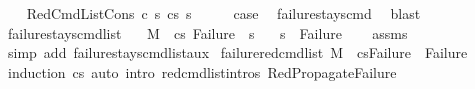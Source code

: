 \begin{isabellebody}
\isamarkupfalse%
\isanewline
\ \ \isamarkupfalse%
\ {\isacharparenleft}{\kern0pt}RedCmdListCons\ c\ s{\isacharprime}{\kern0pt}\ cs\ s{\isacharprime}{\kern0pt}{\isacharprime}{\kern0pt}{\isacharparenright}{\kern0pt}\isanewline
\ \ \isamarkupfalse%
\ \isamarkupfalse%
\ {\isacharquery}{\kern0pt}case\ \isamarkupfalse%
\ failure{\isacharunderscore}{\kern0pt}stays{\isacharunderscore}{\kern0pt}cmd\ \isamarkupfalse%
\ blast\isanewline
{}\isamarkupfalse%
%
\endisatagproof
{\isafoldproof}%
%
\isadelimproof
\isanewline
%
\endisadelimproof
\isanewline
{}\isamarkupfalse%
\ failure{\isacharunderscore}{\kern0pt}stays{\isacharunderscore}{\kern0pt}cmd{\isacharunderscore}{\kern0pt}list{\isacharcolon}{\kern0pt}\isanewline
\ \ \ {\isachardoublequoteopen}M{\isacharcomma}{\kern0pt}{\isasymLambda}{\isacharcomma}{\kern0pt}{\isasymGamma}{\isacharcomma}{\kern0pt}{\isasymOmega}\ {\isasymturnstile}\ {\isasymlangle}cs{\isacharcomma}{\kern0pt}\ Failure{\isasymrangle}\ {\isacharbrackleft}{\kern0pt}{\isasymrightarrow}{\isacharbrackright}{\kern0pt}\ s{\isacharprime}{\kern0pt}{\isachardoublequoteclose}\isanewline
\ \ \ {\isachardoublequoteopen}s{\isacharprime}{\kern0pt}\ {\isacharequal}{\kern0pt}\ Failure{\isachardoublequoteclose}\isanewline
%
\isadelimproof
\ \ %
\endisadelimproof
%
\isatagproof
{}\isamarkupfalse%
\ assms\isanewline
\ \ \isamarkupfalse%
\ {\isacharparenleft}{\kern0pt}simp\ add{\isacharcolon}{\kern0pt}\ failure{\isacharunderscore}{\kern0pt}stays{\isacharunderscore}{\kern0pt}cmd{\isacharunderscore}{\kern0pt}list{\isacharunderscore}{\kern0pt}aux{\isacharparenright}{\kern0pt}%
\endisatagproof
{\isafoldproof}%
%
\isadelimproof
\isanewline
%
\endisadelimproof
\isanewline
{}\isamarkupfalse%
\ failure{\isacharunderscore}{\kern0pt}red{\isacharunderscore}{\kern0pt}cmd{\isacharunderscore}{\kern0pt}list{\isacharcolon}{\kern0pt}\ {\isachardoublequoteopen}M{\isacharcomma}{\kern0pt}{\isasymLambda}{\isacharprime}{\kern0pt}{\isacharcomma}{\kern0pt}{\isasymGamma}{\isacharcomma}{\kern0pt}{\isasymOmega}\ {\isasymturnstile}\ {\isasymlangle}cs{\isacharcomma}{\kern0pt}Failure{\isasymrangle}\ {\isacharbrackleft}{\kern0pt}{\isasymrightarrow}{\isacharbrackright}{\kern0pt}\ Failure{\isachardoublequoteclose}\isanewline
%
\isadelimproof
\ \ %
\endisadelimproof
%
\isatagproof
{}\isamarkupfalse%
\ {\isacharparenleft}{\kern0pt}induction\ cs{\isacharparenright}{\kern0pt}\ {\isacharparenleft}{\kern0pt}auto\ intro{\isacharcolon}{\kern0pt}\ red{\isacharunderscore}{\kern0pt}cmd{\isacharunderscore}{\kern0pt}list{\isachardot}{\kern0pt}intros\ RedPropagateFailure{\isacharparenright}{\kern0pt}%

\end{isabellebody}
